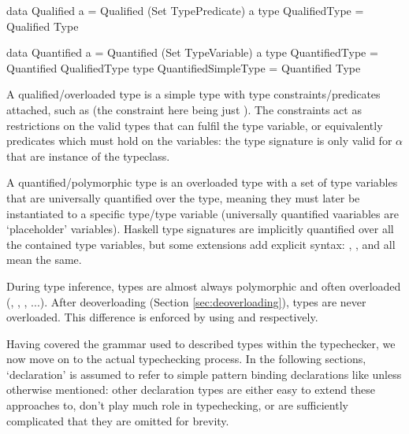 \documentclass[dissertation.tex]{subfiles}
\begin{document}
{{\begin{haskellfigure}
        data Qualified a = Qualified (Set TypePredicate) a
        type QualifiedType = Qualified Type

        data Quantified a = Quantified (Set TypeVariable) a
        type QuantifiedType = Quantified QualifiedType
        type QuantifiedSimpleType = Quantified Type
        \end{haskellfigure}

        A qualified/overloaded type is a simple type with type constraints/predicates attached, such as  (the constraint here being just ). The constraints act as restrictions on the valid types that can fulfil the type variable, or
        equivalently predicates which must hold on the variables: the type signature is only valid for \(\alpha\) that
        are instance of the  typeclass.
    
        A quantified/polymorphic type is an overloaded type with a set of type variables that are universally quantified
        over the type, meaning they must later be instantiated to a specific type/type variable (universally quantified
        vaariables are `placeholder' variables). Haskell type signatures are implicitly quantified over all the
        contained type variables, but some extensions add explicit syntax: , , and
         all mean the same.

        During type inference, types are almost always polymorphic and often overloaded (, , , ...). After deoverloading (Section \ref{sec:deoverloading}), types are never
        overloaded. This difference is enforced by using  and 
        respectively.

        Having covered the grammar used to described types within the typechecker, we now move on to the actual
        typechecking process. In the following sections, `declaration' is assumed to refer to simple pattern binding
        declarations like  unless otherwise mentioned: other declaration types are either easy to
        extend these approaches to, don't play much role in typechecking, or are sufficiently complicated that they are
        omitted for brevity.

}}
\end{document}
